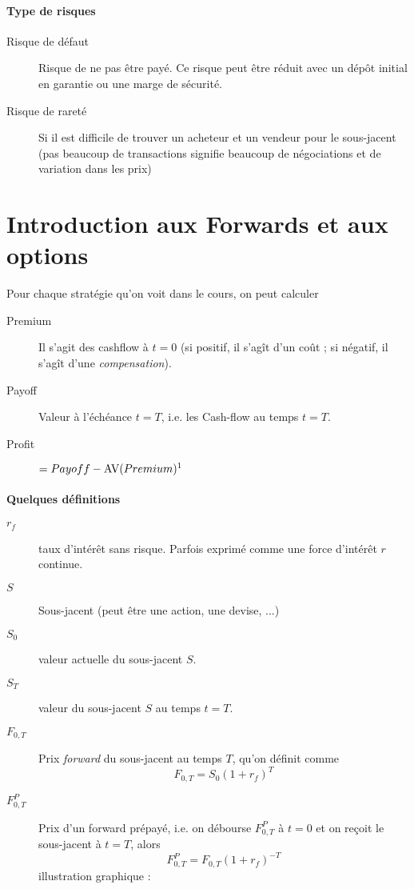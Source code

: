 \documentclass[10pt, french]{article}
\begin{document}
\begin{multicols*}{2}
\paragraph{Type de risques}
\begin{description}
\item[Risque de défaut] Risque de ne pas être payé. Ce risque peut être réduit avec un dépôt initial en garantie ou une marge de sécurité.
\item[Risque de rareté] Si il est difficile de trouver un acheteur et un vendeur pour le sous-jacent (pas beaucoup de transactions signifie beaucoup de négociations et de variation dans les prix)
\end{description}

\section{Introduction aux Forwards et aux options}
Pour chaque stratégie qu'on voit dans le cours, on peut calculer
\begin{description}
\item[Premium] Il s'agit des cashflow à $t=0$ (si positif, il s'agît d'un coût ; si négatif, il s'agît d'une \textit{compensation}).
\item[Payoff] Valeur à l'échéance $t = T$, i.e. les Cash-flow au temps $t = T$.
\item[Profit] $= Payoff - \text{AV}(Premium)\footnote{AV veut dire \textit{accumulated value}.}$
\end{description}

\paragraph{Quelques définitions}
\begin{description}
\item[$r_f$] taux d'intérêt sans risque. Parfois exprimé comme une force d'intérêt $r$ continue.
\item[$S$] Sous-jacent (peut être une action, une devise, ...)
\item[$S_0$] valeur actuelle du sous-jacent $S$.
\item[$S_T$] valeur du sous-jacent $S$ au temps $t = T$.
\item[$F_{0,T}$] Prix \textit{forward} du sous-jacent au temps $T$, qu'on définit comme
\[F_{0,T} = S_0 (1 + r_f)^{T}\]
\item[$F_{0,T}^{P}$] Prix d'un forward prépayé, i.e. on débourse $F_{0,T}^{P}$ à $t=0$ et on reçoit le sous-jacent à $t  = T$, alors
\[F_{0,T}^{P} = F_{0,T} (1 + r_f)^{-T}\]
illustration graphique :

\end{description}

\end{multicols*}
\end{document}
